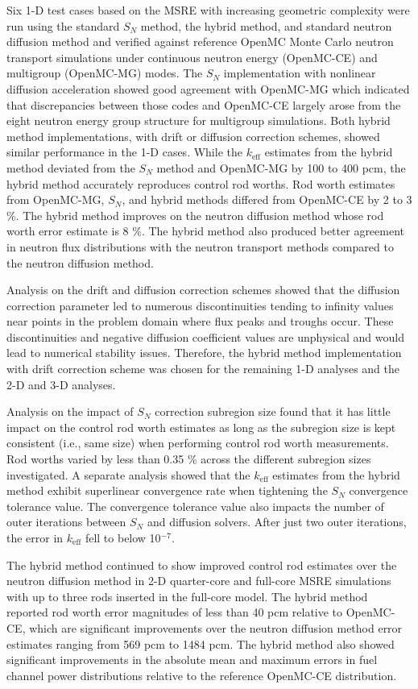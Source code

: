 Six 1-D test cases based on the \gls{MSRE} with increasing geometric complexity were run using the
standard $S_N$ method, the hybrid method, and standard neutron diffusion method and verified against
reference OpenMC Monte Carlo neutron transport simulations under continuous neutron energy (OpenMC-CE) and
multigroup (OpenMC-MG) modes. The $S_N$ implementation with nonlinear diffusion acceleration
showed good agreement with OpenMC-MG which indicated that discrepancies between those codes and
OpenMC-CE largely arose from the eight neutron energy group structure for multigroup simulations.
Both hybrid method implementations, with drift or diffusion correction schemes, showed similar
performance in the 1-D cases. While the $k_\text{eff}$ estimates from the hybrid method deviated
from the $S_N$ method and OpenMC-MG by 100 to 400 pcm, the hybrid method accurately reproduces
control rod worths. Rod worth estimates from OpenMC-MG, $S_N$, and hybrid methods differed from
OpenMC-CE by 2 to 3 \%. The hybrid method improves on the neutron diffusion method whose rod worth
error estimate is 8 \%. The hybrid method also produced better agreement in neutron flux
distributions with the neutron transport methods compared to the neutron diffusion method.

Analysis on the drift and diffusion correction schemes showed that the diffusion correction
parameter led to numerous discontinuities tending to infinity values near points in the problem
domain where flux peaks and troughs occur. These discontinuities and negative diffusion coefficient
values are unphysical and would lead to numerical stability issues. Therefore, the hybrid method
implementation with drift correction scheme was chosen for the remaining 1-D analyses and the
2-D and 3-D analyses.

Analysis on the impact of $S_N$ correction subregion size found that it has little impact on the
control rod worth estimates as long as the subregion size is kept consistent (i.e., same size) when
performing control rod worth measurements. Rod worths varied by less than 0.35 \% across the
different subregion sizes investigated. A separate analysis showed that the $k_\text{eff}$
estimates from the hybrid method exhibit superlinear convergence rate when tightening the $S_N$
convergence tolerance value. The convergence tolerance value also impacts the number of outer
iterations between $S_N$ and diffusion solvers. After just two outer iterations, the error in
$k_\text{eff}$ fell to below 10$^{-7}$.

The hybrid method continued to show improved control rod estimates over the neutron diffusion
method in 2-D quarter-core and full-core \gls{MSRE} simulations with up to three rods inserted in the
full-core model. The hybrid method reported rod worth error magnitudes of less than 40 pcm relative
to OpenMC-CE, which are significant improvements over the neutron diffusion method error estimates
ranging from 569 pcm to 1484 pcm. The hybrid method also showed significant improvements in the
absolute mean and maximum errors in fuel channel power distributions relative to the reference
OpenMC-CE distribution.

